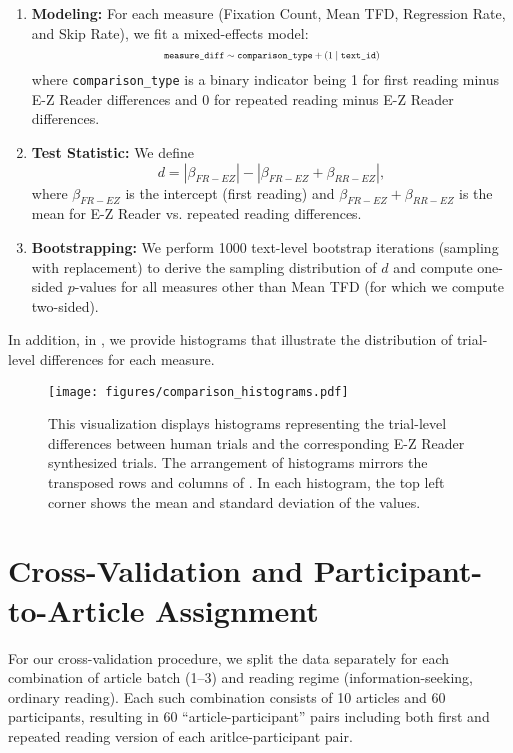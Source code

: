 \begin{enumerate}[leftmargin=*, label=\textbf{\arabic*.}]
    \item \textbf{Modeling:} For each measure (Fixation Count, Mean TFD, Regression Rate, and Skip Rate), we fit a mixed-effects model:
    \[
    \resizebox{0.45\textwidth}{!}{$
    \texttt{measure\_diff} \sim \texttt{comparison\_type} + \left(1\mid \texttt{text\_id}\right)
    $}
    \]
    where \texttt{comparison\_type} is a binary indicator being 1 for first reading minus \mbox{E-Z} Reader differences and 0 for repeated reading minus \mbox{E-Z} Reader differences.

    \item \textbf{Test Statistic:} We define
    \[
    d=|\beta_{FR-EZ}|-|\beta_{FR-EZ}+\beta_{RR-EZ}|,
    \]
    where $\beta_{FR-EZ}$ is the intercept (first reading) and $\beta_{FR-EZ}+\beta_{RR-EZ}$ is the mean for \mbox{E-Z} Reader vs. repeated reading differences.
    
    \item \textbf{Bootstrapping:} We perform 1000 text-level bootstrap iterations (sampling with replacement) to derive the sampling distribution of $d$ and compute one-sided $p$-values for all measures other than Mean TFD (for which we compute two-sided).
\end{enumerate}
In addition, in , we provide histograms that illustrate the distribution of trial-level differences for each measure.

\label{app:sec:synth-data-analysis}
\begin{figure*}
    \centering
    \texttt{[image: figures/comparison\_histograms.pdf]}
    \caption{This visualization displays histograms representing the trial-level differences between human trials and the corresponding E-Z Reader synthesized trials. The arrangement of histograms mirrors the transposed rows and columns of . In each histogram, the top left corner shows the mean and standard deviation of the values.}
    \label{app:fig:gen-quality}
\end{figure*}

\section{Cross-Validation and Participant-to-Article Assignment}
\label{app:CV}

For our cross-validation procedure, we split the data separately for each combination of article batch (1–3) and reading regime (information-seeking, ordinary reading). Each such combination consists of 10 articles and 60 participants, resulting in 60 “article-participant” pairs including both first and repeated reading version of each aritlce-participant pair. 


